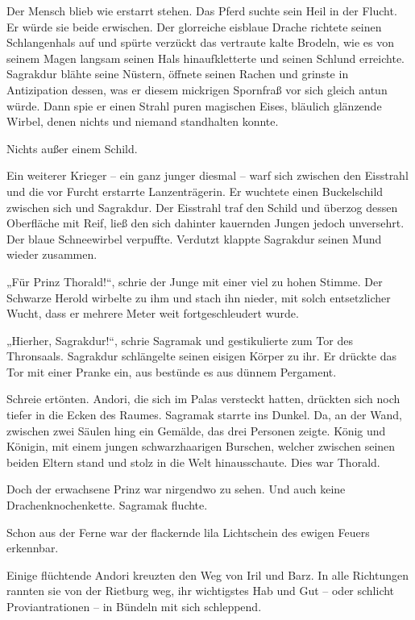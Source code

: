 Der Mensch blieb wie erstarrt stehen. Das Pferd suchte sein Heil in der Flucht. Er würde sie beide erwischen. Der glorreiche eisblaue Drache richtete seinen Schlangenhals auf und spürte verzückt das vertraute kalte Brodeln, wie es von seinem Magen langsam seinen Hals hinaufkletterte und seinen Schlund erreichte. Sagrakdur blähte seine Nüstern, öffnete seinen Rachen und grinste in Antizipation dessen, was er diesem mickrigen Spornfraß vor sich gleich antun würde. Dann spie er einen Strahl puren magischen Eises, bläulich glänzende Wirbel, denen nichts und niemand standhalten konnte.

Nichts außer einem Schild.

Ein weiterer Krieger – ein ganz junger diesmal – warf sich zwischen den Eisstrahl und die vor Furcht erstarrte Lanzenträgerin. Er wuchtete einen Buckelschild zwischen sich und Sagrakdur. Der Eisstrahl traf den Schild und überzog dessen Oberfläche mit Reif, ließ den sich dahinter kauernden Jungen jedoch unversehrt. Der blaue Schneewirbel verpuffte. Verdutzt klappte Sagrakdur seinen Mund wieder zusammen.

„Für Prinz Thorald!“, schrie der Junge mit einer viel zu hohen Stimme. Der Schwarze Herold wirbelte zu ihm und stach ihn nieder, mit solch entsetzlicher Wucht, dass er mehrere Meter weit fortgeschleudert wurde.

„Hierher, Sagrakdur!“, schrie Sagramak und gestikulierte zum Tor des Thronsaals. Sagrakdur schlängelte seinen eisigen Körper zu ihr. Er drückte das Tor mit einer Pranke ein, aus bestünde es aus dünnem Pergament.

Schreie ertönten. Andori, die sich im Palas versteckt hatten, drückten sich noch tiefer in die Ecken des Raumes. Sagramak starrte ins Dunkel. Da, an der Wand, zwischen zwei Säulen hing ein Gemälde, das drei Personen zeigte. König und Königin, mit einem jungen schwarzhaarigen Burschen, welcher zwischen seinen beiden Eltern stand und stolz in die Welt hinausschaute. Dies war Thorald.

Doch der erwachsene Prinz war nirgendwo zu sehen. Und auch keine Drachenknochenkette. Sagramak fluchte.\bigskip







Schon aus der Ferne war der flackernde lila Lichtschein des ewigen Feuers erkennbar.

Einige flüchtende Andori kreuzten den Weg von Iril und Barz. In alle Richtungen rannten sie von der Rietburg weg, ihr wichtigstes Hab und Gut – oder schlicht Proviantrationen – in Bündeln mit sich schleppend.


